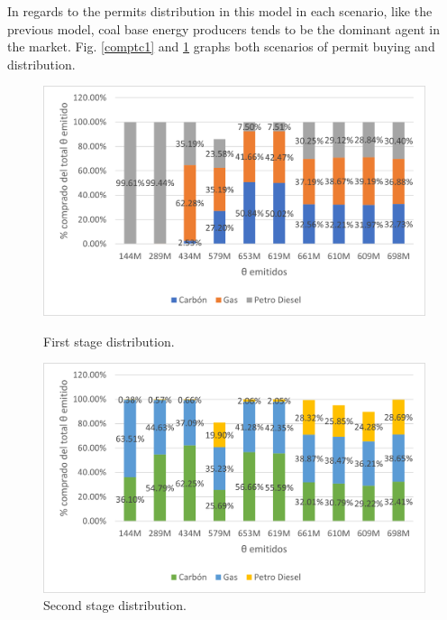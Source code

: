\documentclass[a4paper,fleqn]{cas-dc}
\begin{document}
In regards to the permits distribution in this model in each scenario, like the previous model, coal base energy producers tends to be the dominant agent in the market. Fig. \ref{comptc1} and \ref{comptc2} graphs both scenarios of permit buying and distribution. 

\begin{figure}[h]
  \centering
  \begin{minipage}[b]{0.49\textwidth}
    \includegraphics[width=\textwidth]{Submissions/EnergyPolicy/Images/distr primera etapa tasa cuadrada.png}
    \caption{{\footnotesize First stage distribution.}}
    \label{comptc1}
  \end{minipage}
  \hfill
  \begin{minipage}[b]{0.49\textwidth}
    \includegraphics[width=\textwidth]{Submissions/EnergyPolicy/Images/distr segunda etapa tasa cuadrada.png}
    \caption{{\footnotesize Second stage distribution.}}
    \label{comptc2}
  \end{minipage}
\end{figure}
\end{document}
